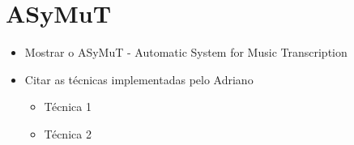 \chapter{ASyMuT}
\label{cap:asymut}

\begin{itemize}
\item Mostrar o ASyMuT - Automatic System for Music Transcription
\item Citar as técnicas implementadas pelo Adriano
	\begin{itemize}
	\item Técnica 1
	\item Técnica 2
	\end{itemize}
\end{itemize}



  
  
  
  
  